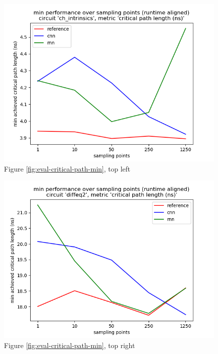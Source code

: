 \begin{figure}[H]
\includegraphics[width=\linewidth]{plots/eval-ch_intrinsics-critical-path-min-full.png}
\caption{Figure \ref{fig:eval-critical-path-min}, top left}
\end{figure}

\begin{figure}[H]
\includegraphics[width=\linewidth]{plots/eval-diffeq2-critical-path-min-full.png}
\caption{Figure \ref{fig:eval-critical-path-min}, top right}
\end{figure}

